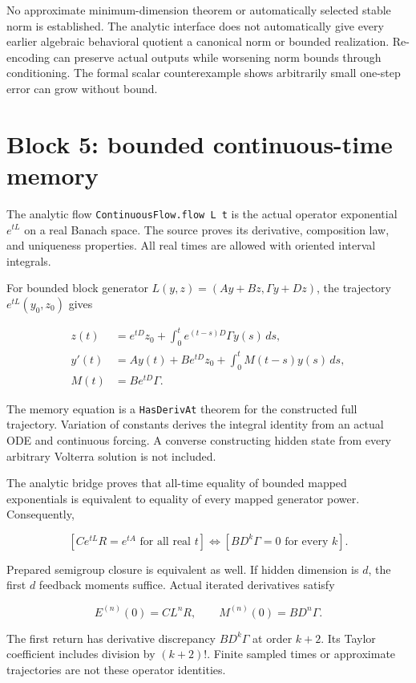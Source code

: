 \documentclass[11pt]{article}
\begin{document}
No approximate minimum-dimension theorem or automatically selected
stable norm is established. The analytic interface does not
automatically give every earlier algebraic behavioral quotient a
canonical norm or bounded realization. Re-encoding can preserve actual
outputs while worsening norm bounds through conditioning. The formal
scalar counterexample shows arbitrarily small one-step error can grow
without bound.

\hypertarget{block-5-bounded-continuous-time-memory}{%
\section{Block 5: bounded continuous-time
memory}\label{block-5-bounded-continuous-time-memory}}

The analytic flow \texttt{ContinuousFlow.flow L t} is
the actual operator exponential \(e^{tL}\) on a real Banach space. The
source proves its derivative, composition law, and uniqueness
properties. All real times are allowed with oriented interval integrals.

For bounded block generator \(L(y,z)=(Ay+Bz,\Gamma y+Dz)\), the
trajectory \(e^{tL}(y_0,z_0)\) gives

\[
\begin{aligned}
z(t)&=e^{tD}z_0+\int_0^te^{(t-s)D}\Gamma y(s)\,ds,\\
y'(t)&=Ay(t)+Be^{tD}z_0+\int_0^tM(t-s)y(s)\,ds,\\
M(t)&=Be^{tD}\Gamma.
\end{aligned}
\]

The memory equation is a \texttt{HasDerivAt} theorem
for the constructed full trajectory. Variation of constants derives the
integral identity from an actual ODE and continuous forcing. A converse
constructing hidden state from every arbitrary Volterra solution is not
included.

The analytic bridge proves that all-time equality of bounded mapped
exponentials is equivalent to equality of every mapped generator power.
Consequently,

\[
[Ce^{tL}R=e^{tA}\text{ for all real }t]
\iff[BD^k\Gamma=0\text{ for every }k].
\]

Prepared semigroup closure is equivalent as well. If hidden dimension is
\(d\), the first \(d\) feedback moments suffice. Actual iterated
derivatives satisfy

\[
E^{(n)}(0)=CL^nR,\qquad M^{(n)}(0)=BD^n\Gamma.
\]

The first return has derivative discrepancy \(BD^k\Gamma\) at order
\(k+2\). Its Taylor coefficient includes division by \((k+2)!\). Finite
sampled times or approximate trajectories are not these operator
identities.
\end{document}
